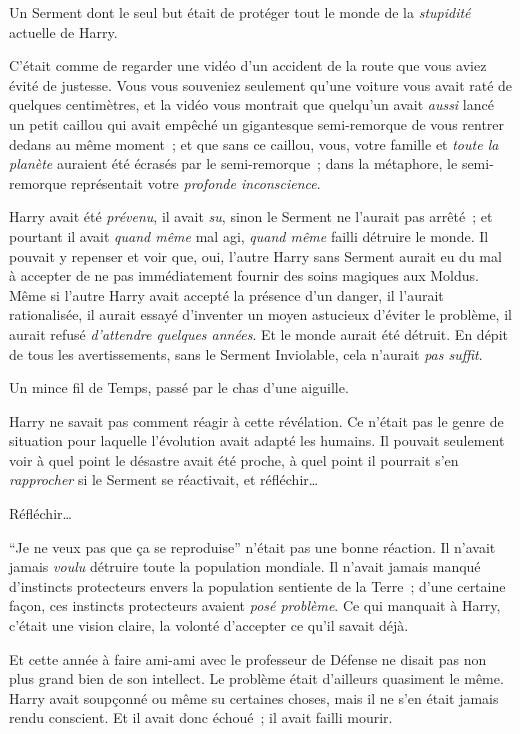 Un Serment dont le seul but était de protéger tout le monde de la \emph{stupidité} actuelle de Harry.

C'était comme de regarder une vidéo d'un accident de la route que vous aviez évité de justesse. Vous vous souveniez seulement qu'une voiture vous avait raté de quelques centimètres, et la vidéo vous montrait que quelqu'un avait \emph{aussi} lancé un petit caillou qui avait empêché un gigantesque semi-remorque de vous rentrer dedans au même moment~; et que sans ce caillou, vous, votre famille et \emph{toute la planète} auraient été écrasés par le semi-remorque~; dans la métaphore, le semi-remorque représentait votre \emph{profonde inconscience}.

Harry avait été \emph{prévenu}, il avait \emph{su}, sinon le Serment ne l'aurait pas arrêté~; et pourtant il avait \emph{quand même} mal agi, \emph{quand même} failli détruire le monde. Il pouvait y repenser et voir que, oui, l'autre Harry sans Serment aurait eu du mal à accepter de ne pas immédiatement fournir des soins magiques aux Moldus. Même si l'autre Harry avait accepté la présence d'un danger, il l'aurait rationalisée, il aurait essayé d'inventer un moyen astucieux d'éviter le problème, il aurait refusé \emph{d'attendre quelques années}. Et le monde aurait été détruit. En dépit de tous les avertissements, sans le Serment Inviolable, cela n'aurait \emph{pas suffit}.

Un mince fil de Temps, passé par le chas d'une aiguille.

Harry ne savait pas comment réagir à cette révélation. Ce n'était pas le genre de situation pour laquelle l'évolution avait adapté les humains. Il pouvait seulement voir à quel point le désastre avait été proche, à quel point il pourrait s'en \emph{rapprocher} si le Serment se réactivait, et réfléchir…

Réfléchir…

“Je ne veux pas que ça se reproduise” n'était pas une bonne réaction. Il n'avait jamais \emph{voulu} détruire toute la population mondiale. Il n'avait jamais manqué d'instincts protecteurs envers la population sentiente de la Terre~; d'une certaine façon, ces instincts protecteurs avaient \emph{posé problème}. Ce qui manquait à Harry, c'était une vision claire, la volonté d'accepter ce qu'il savait déjà.

Et cette année à faire ami-ami avec le professeur de Défense ne disait pas non plus grand bien de son intellect. Le problème était d'ailleurs quasiment le même. Harry avait soupçonné ou même su certaines choses, mais il ne s'en était jamais rendu conscient. Et il avait donc échoué~; il avait failli mourir.

